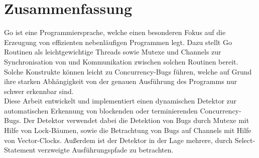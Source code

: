 \chapter*{Zusammenfassung}
Go ist eine Programmiersprache, welche einen besonderen Fokus auf 
die Erzeugung von effizienten nebenläufigen Programmen legt. Dazu 
stellt Go Routinen als leichtgewichtige Threads sowie 
Mutexe und Channels zur Synchronisation von und Kommunikation zwischen 
solchen Routinen bereit. Solche Konstrukte können leicht zu 
Concurrency-Bugs führen, welche auf Grund ihre starken Abhängigkeit von der 
genauen Ausführung des Programms nur schwer erkennbar sind.\\
Diese Arbeit entwickelt und implementiert einen dynamischen Detektor zur automatischen
Erkennung von blockenden oder terminierenden Concurrency-Bugs. 
Der Detektor verwendet dabei die Detektion 
von Bugs durch Mutexe mit Hilfe von Lock-Bäumen, sowie die Betrachtung von 
Bugs auf Channels mit Hilfe von 
Vector-Clocks. Außerdem ist der Detektor in der 
Lage mehrere, durch Select-Statement verzweigte Ausführungspfade zu betrachten.